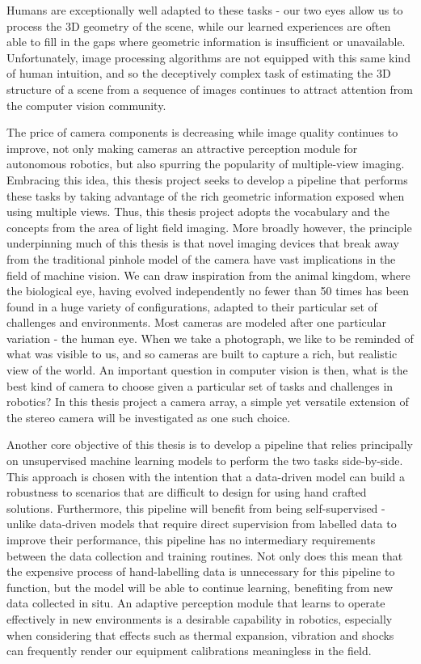 \documentclass[openany]{book}
\begin{document}
Humans are exceptionally well adapted to these tasks - our two eyes allow us to process the 3D geometry of the scene, while our learned experiences are often able to fill in the gaps where geometric information is insufficient or unavailable. Unfortunately, image processing algorithms are not equipped with this same kind of human intuition, and so the deceptively complex task of estimating the 3D structure of a scene from a sequence of images continues to attract attention from the computer vision community. 


The price of camera components is decreasing while image quality continues to improve, not only making cameras an attractive perception module for autonomous robotics, but also spurring the popularity of multiple-view imaging. Embracing this idea, this thesis project seeks to develop a pipeline that performs these tasks by taking advantage of the rich geometric information exposed when using multiple views. Thus, this thesis project adopts the vocabulary and the concepts from the area of light field imaging. More broadly however, the principle underpinning much of this thesis is that novel imaging devices that break away from the traditional pinhole model of the camera have vast implications in the field of machine vision. We can draw inspiration from the animal kingdom, where the biological eye, having evolved independently no fewer than 50 times has been found in a huge variety of configurations, adapted to their particular set of challenges and environments. Most cameras are modeled after one particular variation - the human eye. When we take a photograph, we like to be reminded of what was visible to us, and so cameras are built to capture a rich, but realistic view of the world. An important question in computer vision is then, what is the best kind of camera to choose given a particular set of tasks and challenges in robotics? In this thesis project a camera array, a simple yet versatile extension of the stereo camera will be investigated as one such choice.


Another core objective of this thesis is to develop a pipeline that relies principally on unsupervised machine learning models to perform the two tasks side-by-side. This approach is chosen with the intention that a data-driven model can build a robustness to scenarios that are difficult to design for using hand crafted solutions.  Furthermore, this pipeline will benefit from being self-supervised - unlike data-driven models that require direct supervision from labelled data to improve their performance, this pipeline has no intermediary requirements between the data collection and training routines. Not only does this mean that the expensive process of hand-labelling data is unnecessary for this pipeline to function, but the model will be able to continue learning, benefiting from new data collected in situ. An adaptive perception module that learns to operate effectively in new environments is a desirable capability in robotics, especially when considering that effects such as thermal expansion, vibration and shocks can frequently render our equipment calibrations meaningless in the field. 
\end{document}
